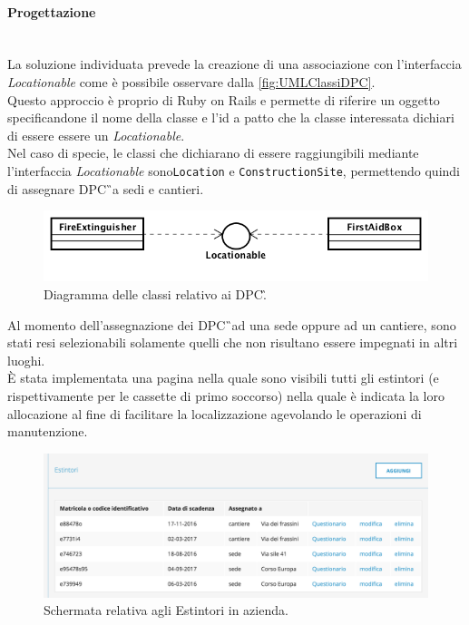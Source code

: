 \paragraph*{Progettazione}\mbox{}\\
La soluzione individuata prevede la creazione di una associazione con l'interfaccia \textit{Locationable} come è possibile osservare dalla \autoref{fig:UMLClassiDPC}.\\
Questo approccio è proprio di Ruby on Rails e permette di riferire un oggetto specificandone il nome della classe e l'id a patto che la classe interessata dichiari di essere essere un \textit{Locationable}.\\
Nel caso di specie, le classi che dichiarano di essere raggiungibili mediante l'interfaccia \textit{Locationable} sono\texttt{Location} e \texttt{ConstructionSite}, permettendo quindi di assegnare \gls{DPC}\G\ a sedi e cantieri.
\begin{figure}[H]
	\begin{center}
		\includegraphics[width=12cm]{Pics/UMLClassiDPC.png}
		\caption{Diagramma delle classi relativo ai \gls{DPC}\G.}
		\label{fig:UMLClassiDPC}
	\end{center}
\end{figure}

Al momento dell'assegnazione dei \gls{DPC}\G\ ad una sede oppure ad un cantiere, sono stati resi selezionabili solamente quelli che non risultano essere impegnati in altri luoghi.\\
È stata implementata una pagina nella quale sono visibili tutti gli estintori (e rispettivamente per le cassette di primo soccorso) nella quale è indicata la loro allocazione al fine di facilitare la localizzazione agevolando le operazioni di manutenzione.

\begin{figure}[H]
	\begin{center}
		\includegraphics[width=15cm]{Pics/ScreenIndexEstintori.png}
		\caption{Schermata relativa agli Estintori in azienda.}
		\label{fig:ScreenIndexEstintori}
	\end{center}
\end{figure}




